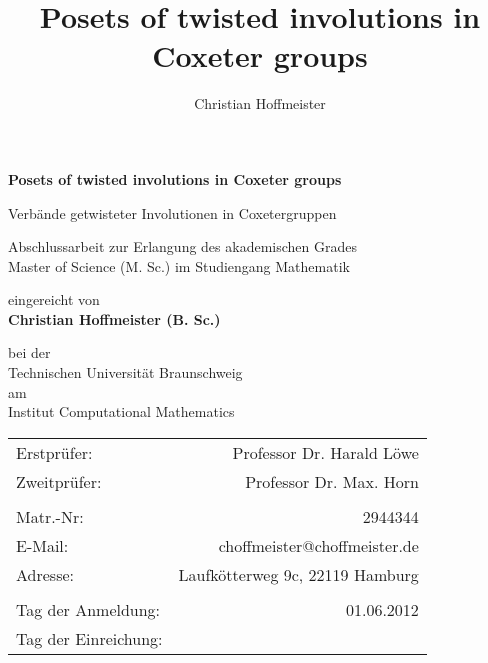 \title{Posets of twisted involutions in Coxeter groups}
\author{Christian Hoffmeister}

\begin{titlepage}
\begin{center}
{\Large \bf Posets of twisted involutions in Coxeter groups}

{\large Verbände getwisteter Involutionen in Coxetergruppen}

\vspace*{2.5cm}
Abschlussarbeit zur Erlangung des akademischen Grades\\
Master of Science (M. Sc.) im Studiengang Mathematik

\vspace*{2.5cm}
eingereicht von \\
{\Large \bf Christian Hoffmeister (B. Sc.)}

\vspace*{2.5cm}
bei der \\
Technischen Universität Braunschweig \\
am \\
Institut Computational Mathematics

\vfill
\begin{tabular}{lr}
	Erstprüfer: & Professor Dr. Harald Löwe \\
	Zweitprüfer: & Professor Dr. Max. Horn \\
	\vspace*{0.5em} & \\
	Matr.-Nr: & 2944344 \\
	E-Mail: & choffmeister@choffmeister.de \\
	Adresse: & Laufkötterweg 9c, 22119 Hamburg \\
	\vspace*{0.5em} & \\
	Tag der Anmeldung: & 01.06.2012 \\
	Tag der Einreichung: & \\
\end{tabular}
\end{center}
\end{titlepage}